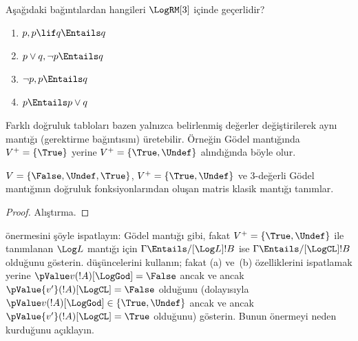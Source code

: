 \documentclass[../../../include/open-logic-section]{subfiles}
\begin{document}
\begin{prob}
  Aşağıdaki bağıntılardan hangileri $\LogRM[3]$ içinde geçerlidir?
  \begin{enumerate}
    \item $p, p \lif q \Entails q$
    \item $p \lor q, \lnot p \Entails q$
    \item $\lnot p, p \Entails q$
    \item $p \Entails p \lor q$
  \end{enumerate}
\end{prob}

Farklı doğruluk tabloları bazen yalnızca belirlenmiş değerler değiştirilerek
aynı mantığı (gerektirme bağıntısını) üretebilir. Örneğin G\"odel mantığında
$V^+ = \{\True\}$ yerine $V^+ = \{\True, \Undef\}$ alındığında böyle olur.

\begin{prop}
  $V = \{\False, \Undef,\True\}$, $V^+=\{\True, \Undef\}$ ve $3$-değerli
  G\"odel mantığının doğruluk fonksiyonlarından oluşan matris klasik mantığı
  tanımlar.
\end{prop}

\begin{proof}
  Alıştırma.
\end{proof}

\begin{prob}
   önermesini şöyle ispatlayın:
  G\"odel mantığı gibi, fakat $V^+=\{\True,\Undef\}$ ile tanımlanan
  $\Log L$ mantığı için $\Gamma \Entails/[\Log L] !B$ ise
  $\Gamma \Entails/[\LogCL] !B$ olduğunu gösterin.
   düşüncelerini kullanın; fakat
  (a) ve~(b) özelliklerini ispatlamak yerine
  $\pValue v(!A)[\LogGod] = \False$ ancak ve ancak
  $\pValue {v'}(!A)[\LogCL] = \False$ olduğunu (dolayısıyla
  $\pValue v(!A)[\LogGod] \in \{\True,\Undef\}$ ancak ve ancak
  $\pValue {v'}(!A)[\LogCL] = \True$ olduğunu) gösterin. Bunun önermeyi
  neden kurduğunu açıklayın.
\end{prob}
\end{document}
